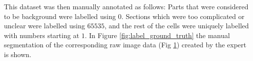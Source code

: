 \documentclass[
  digital,     %
  oneside,     %
  nosansbold,  %
  nocolorbold, %
  lof,         %
  lot,         %
]{fithesis4}
\begin{document}
This dataset was then manually annotated as follows: Parts that were considered to be background were labelled using $0$.
Sections which were too complicated or unclear were labelled using $65535$, and
the rest of the cells were uniquely labelled with numbers starting at $1$. In
Figure \ref{fig:label_ground_truth} the manual segmentation of the corresponding raw image data (Fig \ref{fig:label_membrane_channel}) created by the expert is shown.

\begin{figure}
    \begin{subfigure}[t]{0.4\textwidth}
        \centering
        \caption{}
        \label{fig:label_membrane_channel}
    \end{subfigure}
    \begin{subfigure}[t]{0.4\textwidth}
        \centering

\end{subfigure}
\end{figure}
\end{document}
